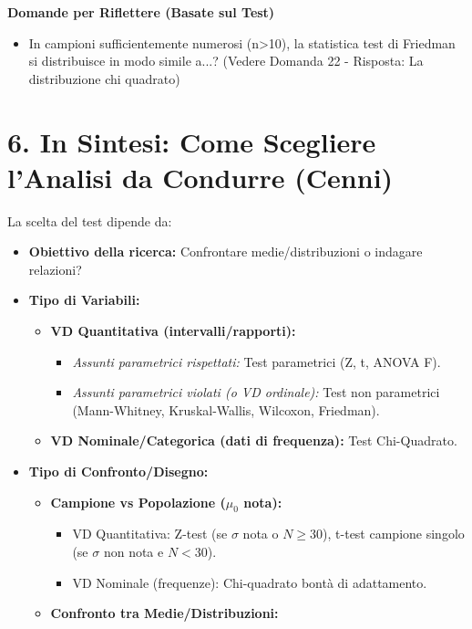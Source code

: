\documentclass[12pt, a4paper]{article}
\newenvironment{reflectionbox}{%
    \medskip
    \begin{framed}\par\noindent
    \textbf{\color{boxtitlecolor}Domande per Riflettere (Basate sul Test)} \par
    \begin{itemize}[leftmargin=*, label=$\blacktriangleright$]
}{%
    \end{itemize}\par
    \end{framed}
    \medskip
}
\begin{document}
\begin{reflectionbox}
    \item In campioni sufficientemente numerosi (n>10), la statistica test di Friedman si distribuisce in modo simile a...? (Vedere Domanda 22 - Risposta: La distribuzione chi quadrato)
\end{reflectionbox}

\section*{6. In Sintesi: Come Scegliere l'Analisi da Condurre (Cenni)}
La scelta del test dipende da:
\begin{itemize}
    \item \textbf{Obiettivo della ricerca:} Confrontare medie/distribuzioni o indagare relazioni?
    \item \textbf{Tipo di Variabili:}
        \begin{itemize}
            \item \textbf{VD Quantitativa (intervalli/rapporti):}
                \begin{itemize}
                    \item \textit{Assunti parametrici rispettati:} Test parametrici (Z, t, ANOVA F).
                    \item \textit{Assunti parametrici violati (o VD ordinale):} Test non parametrici (Mann-Whitney, Kruskal-Wallis, Wilcoxon, Friedman).
                \end{itemize}
            \item \textbf{VD Nominale/Categorica (dati di frequenza):} Test Chi-Quadrato.
        \end{itemize}
    \item \textbf{Tipo di Confronto/Disegno:}
        \begin{itemize}
            \item \textbf{Campione vs Popolazione ($\mu_0$ nota):}
                \begin{itemize}
                    \item VD Quantitativa: Z-test (se $\sigma$ nota o $N \ge 30$), t-test campione singolo (se $\sigma$ non nota e $N < 30$).
                    \item VD Nominale (frequenze): Chi-quadrato bontà di adattamento.
                \end{itemize}
            \item \textbf{Confronto tra Medie/Distribuzioni:}
                \begin{itemize}

\end{itemize}
\end{itemize}
\end{itemize}
\end{document}

